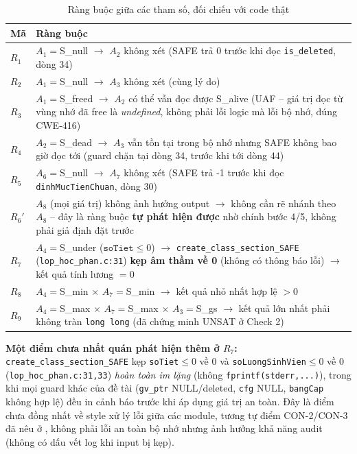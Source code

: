 \begin{table}[H]
  \centering
  \caption{Ràng buộc giữa các tham số, đối chiếu với code thật}
  \label{tab:constraints}
  \footnotesize
  \begin{tabularx}{\linewidth}{@{}l X@{}}
    \toprule
    \textbf{Mã} & \textbf{Ràng buộc} \\
    \midrule
    $R_1$ & $A_1{=}$S\_null $\to$ $A_2$ không xét (SAFE trả 0 trước khi đọc \texttt{is\_deleted}, dòng 34) \\
    $R_2$ & $A_1{=}$S\_null $\to$ $A_3$ không xét (cùng lý do) \\
    $R_3$ & $A_1{=}$S\_freed $\to$ $A_2$ có thể vẫn đọc được S\_alive (UAF -- giá trị đọc từ vùng nhớ đã free là \emph{undefined}, không phải lỗi logic mà lỗi bộ nhớ, đúng CWE-416) \\
    $R_4$ & $A_2{=}$S\_dead $\to$ $A_3$ vẫn tồn tại trong bộ nhớ nhưng SAFE không bao giờ đọc tới (guard chặn tại dòng 34, trước khi tới dòng 44) \\
    $R_5$ & $A_6{=}$S\_null $\to$ $A_7$ không xét (SAFE trả -1 trước khi đọc \texttt{dinhMucTienChuan}, dòng 30) \\
    $R_6'$ & $A_8$ (mọi giá trị) không ảnh hưởng output $\to$ không cần rẽ nhánh theo $A_8$ -- đây là ràng buộc \textbf{tự phát hiện được} nhờ chính bước 4/5, không phải giả định đặt trước \\
    $R_7$ & $A_4{=}$S\_under ($\texttt{soTiet}\le 0$) $\to$ \texttt{create\_class\_section\_SAFE} (\texttt{lop\_hoc\_phan.c:31}) \textbf{kẹp âm thầm về 0} (không có thông báo lỗi) $\to$ kết quả tính lương $=0$ \\
    $R_8$ & $A_4{=}$S\_min $\times$ $A_7{=}$S\_min $\to$ kết quả nhỏ nhất hợp lệ $>0$ \\
    $R_9$ & $A_4{=}$S\_max $\times$ $A_7{=}$S\_max $\times$ $A_3{=}$S\_gs $\to$ kết quả lớn nhất phải không tràn \texttt{long long} (đã chứng minh UNSAT ở Check 2) \\
    \bottomrule
  \end{tabularx}
\end{table}

\textbf{Một điểm chưa nhất quán phát hiện thêm ở $R_7$:} \texttt{create\_class\_section\_SAFE} kẹp \texttt{soTiet}$\le 0$ về $0$ và \texttt{soLuongSinhVien}$\le 0$ về $0$ (\texttt{lop\_hoc\_phan.c:31,33}) \emph{hoàn toàn im lặng} (không \texttt{fprintf(stderr,...)}), trong khi mọi guard khác của đề tài (\texttt{gv\_ptr} NULL/deleted, \texttt{cfg} NULL, \texttt{bangCap} không hợp lệ) đều in cảnh báo trước khi áp dụng giá trị an toàn. Đây là điểm chưa đồng nhất về style xử lý lỗi giữa các module, tương tự điểm CON-2/CON-3 đã nêu ở , không phải lỗi an toàn bộ nhớ nhưng ảnh hưởng khả năng audit (không có dấu vết log khi input bị kẹp).

